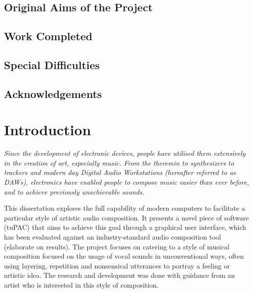 \documentclass[12pt,a4paper,twoside,openright]{report}
\begin{document}
\section*{Original Aims of the Project}




\section*{Work Completed}


\section*{Special Difficulties}


\newpage

\tableofcontents

\listoffigures

\newpage
\section*{Acknowledgements}



\pagestyle{headings}

\chapter{Introduction}
\textit{
Since the development of electronic devices, people have utilised them extensively in the creation of art, especially music. From the theremin to synthesizers to trackers and modern day Digital Audio Workstations (hereafter referred to as DAWs), electronics have enabled people to compose music easier than ever before, and to achieve previously unachievable sounds.
}

This dissertation explores the full capability of modern computers to facilitate a particular style of artistic audio composition. It presents a novel piece of software (tuPAC) that aims to achieve this goal through a graphical user interface, which has been evaluated against an industry-standard audio composition tool (elaborate on results). The project focuses on catering to a style of musical composition focused on the usage of vocal sounds in unconventional ways, often using layering, repetition and nonsensical utterances to portray a feeling or artistic idea. The research and development was done with guidance from an artist who is interested in this style of composition.
\end{document}
